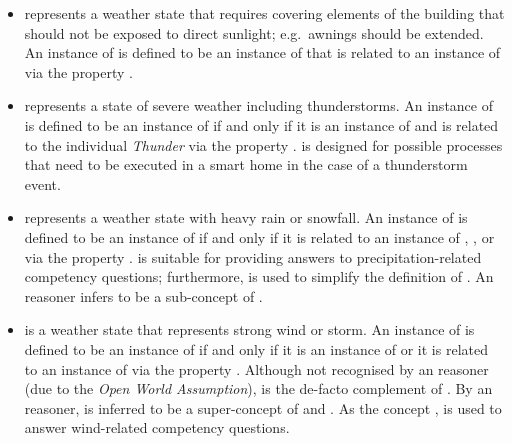 \begin{itemize}
  \item {} represents a weather state that requires covering elements of the building that should not be exposed to direct sunlight; e.g.\ awnings should be extended. An instance of  is defined to be an instance of  that is related to an instance of  via the property .
  
  \item {} represents a state of severe weather including thunderstorms. An instance of  is defined to be an instance of  if and only if it is an instance of  and is related to the individual \emph{Thunder} via the property .  is designed for possible processes that need to be executed in a smart home in the case of a thunderstorm event.
  
  \item {} represents a weather state with heavy rain or snowfall. An instance of  is defined to be an instance of  if and only if it is related to an instance of , , or  via the property .  is suitable for providing answers to precipitation-related competency questions; furthermore,  is used to simplify the definition of . An  reasoner infers  to be a sub-concept of .
  
  \item {} is a weather state that represents strong wind or storm. An instance of  is defined to be an instance of  if and only if it is an instance of  or it is related to an instance of  via the property . Although not recognised by an  reasoner (due to the \emph{Open World Assumption}),  is the de-facto complement of . By an  reasoner,  is inferred to be a super-concept of  and . As the concept ,  is used to answer wind-related competency questions.
\end{itemize}

